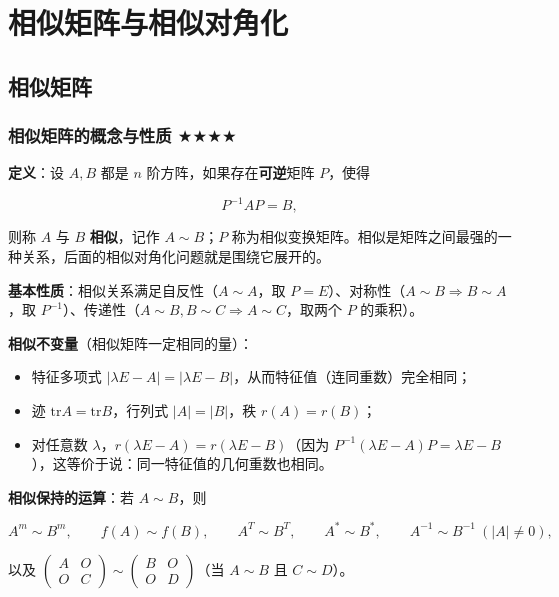 \documentclass[11pt,openany,UTF8]{ctexbook}
\begin{document}
\section{相似矩阵与相似对角化}

\subsection{相似矩阵}

\subsubsection{相似矩阵的概念与性质 $\bigstar$$\bigstar$$\bigstar$$\bigstar$}

\textbf{定义}：设 $A,B$ 都是 $n$ 阶方阵，如果存在\textbf{可逆}矩阵 $P$，使得

\[P^{-1}AP=B,\]

则称 $A$ 与 $B$ \textbf{相似}，记作 $A\sim B$；$P$ 称为相似变换矩阵。相似是矩阵之间最强的一种关系，后面的相似对角化问题就是围绕它展开的。

\textbf{基本性质}：相似关系满足自反性（$A\sim A$，取 $P=E$）、对称性（$A\sim B\Rightarrow B\sim A$，取 $P^{-1}$）、传递性（$A\sim B,B\sim C\Rightarrow A\sim C$，取两个 $P$ 的乘积）。

\textbf{相似不变量}（相似矩阵一定相同的量）：

\begin{itemize}
\item 特征多项式 $\vert\lambda E-A\vert=\vert\lambda E-B\vert$，从而特征值（连同重数）完全相同；
\item 迹 $\mathrm{tr}A=\mathrm{tr}B$，行列式 $\vert A\vert=\vert B\vert$，秩 $r(A)=r(B)$；
\item 对任意数 $\lambda$，$r(\lambda E-A)=r(\lambda E-B)$（因为 $P^{-1}(\lambda E-A)P=\lambda E-B$），这等价于说：同一特征值的几何重数也相同。
\end{itemize}
\textbf{相似保持的运算}：若 $A\sim B$，则

\[A^m\sim B^m,\qquad f(A)\sim f(B),\qquad A^T\sim B^T,\qquad A^*\sim B^*,\qquad A^{-1}\sim B^{-1}\ (\vert A\vert\neq0),\]

以及 $\begin{pmatrix}A&O\\O&C\end{pmatrix}\sim\begin{pmatrix}B&O\\O&D\end{pmatrix}$（当 $A\sim B$ 且 $C\sim D$）。
\end{document}
